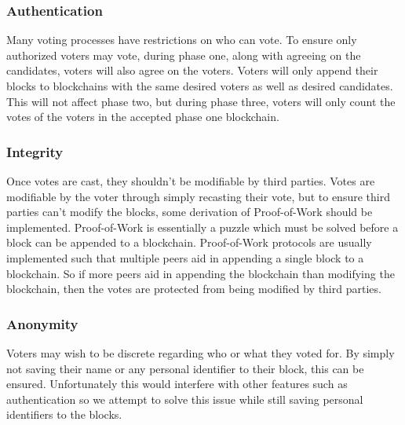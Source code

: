\documentclass[conference]{IEEEtran}
\begin{document}
\subsubsection{Authentication}
Many voting processes have restrictions on who can vote. To ensure only authorized voters may vote, during phase one, along with agreeing on the candidates, voters will also agree on the voters. Voters will only append their blocks to blockchains with the same desired voters as well as desired candidates. This will not affect phase two, but during phase three, voters will only count the votes of the voters in the accepted phase one blockchain.

\subsubsection{Integrity}
Once votes are cast, they shouldn't be modifiable by third parties. Votes are modifiable by the voter through simply recasting their vote, but to ensure third parties can't modify the blocks, some derivation of Proof-of-Work should be implemented. Proof-of-Work is essentially a puzzle which must be solved before a block can be appended to a blockchain. Proof-of-Work protocols are usually implemented such that multiple peers aid in appending a single block to a blockchain. So if more peers aid in appending the blockchain than modifying the blockchain, then the votes are protected from being modified by third parties. 

\subsubsection{Anonymity}
Voters may wish to be discrete regarding who or what they voted for. By simply not saving their name or any personal identifier to their block, this can be ensured. Unfortunately this would interfere with other features such as authentication so we attempt to solve this issue while still saving personal identifiers to the blocks. 
\end{document}
